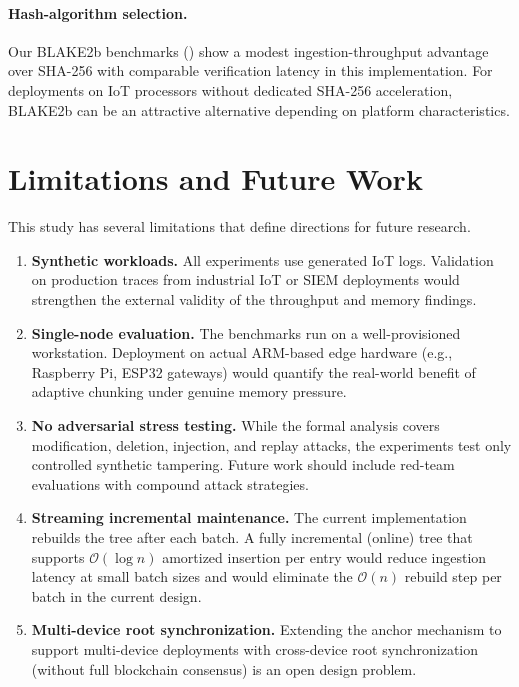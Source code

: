 \documentclass[preprint,12pt]{elsarticle}
\begin{document}
\paragraph{Hash-algorithm selection.}
Our BLAKE2b benchmarks () show a modest ingestion-throughput advantage over SHA-256 with comparable verification latency in this implementation.
For deployments on IoT processors without dedicated SHA-256 acceleration, BLAKE2b can be an attractive alternative depending on platform characteristics.

\section{Limitations and Future Work}
\label{sec:limits}

This study has several limitations that define directions for future research.

\begin{enumerate}[leftmargin=*, label=\textbf{L\arabic*.}]
  \item \textbf{Synthetic workloads.}
    All experiments use generated IoT logs.
    Validation on production traces from industrial IoT or SIEM deployments would strengthen the external validity of the throughput and memory findings.

  \item \textbf{Single-node evaluation.}
    The benchmarks run on a well-provisioned workstation.
    Deployment on actual ARM-based edge hardware (e.g., Raspberry Pi, ESP32 gateways) would quantify the real-world benefit of adaptive chunking under genuine memory pressure.

  \item \textbf{No adversarial stress testing.}
    While the formal analysis covers modification, deletion, injection, and replay attacks, the experiments test only controlled synthetic tampering.
    Future work should include red-team evaluations with compound attack strategies.

  \item \textbf{Streaming incremental maintenance.}
    The current implementation rebuilds the tree after each batch.
    A fully incremental (online) tree that supports $\mathcal{O}(\log n)$ amortized insertion per entry would reduce ingestion latency at small batch sizes and would eliminate the $\mathcal{O}(n)$ rebuild step per batch in the current design.

  \item \textbf{Multi-device root synchronization.}
    Extending the anchor mechanism to support multi-device deployments with cross-device root synchronization (without full blockchain consensus) is an open design problem.
\end{enumerate}
\end{document}
